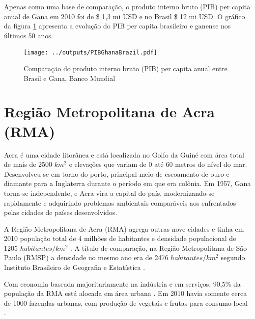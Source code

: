 Apenas como uma base de comparação, o produto interno bruto (PIB) per capita 
anual de Gana em 2010 foi de \$ 1,3 mi USD e no Brasil \$ 12 mi USD. 
O gráfico da figura \ref{fg:pib} apresenta a evolução do PIB per capita brasileiro e 
ganense nos últimos 50 anos.

\begin{figure}[H]
  \centering
  \texttt{[image: ../outputs/PIBGhanaBrazil.pdf]}
  \caption{Comparação do produto interno bruto (PIB) per capita anual entre 
           Brasil e Gana, Banco Mundial \citeyearpar{bancomundial} 
          \label{fg:pib}}
\end{figure}


\newpage
\section{Região Metropolitana de Acra (RMA)}

Acra é uma cidade litorânea e está localizada no Golfo da Guiné com área total
de mais de  2500 $km^2$ e elevações que variam de 0 até 60 metros do nível do 
mar. Desenvolveu-se em torno do porto, principal meio de escoamento de ouro e 
diamante para a Inglaterra durante o período em que era colônia. 
Em 1957, Gana torna-se independente, e Acra vira a capital do país, 
modernizando-se rapidamente e adquirindo problemas ambientais comparáveis aos enfrentados pelas cidades de países desenvolvidos.

A Região Metropolitana de Acra (RMA) agrega outras nove cidades e tinha em 2010
população total de 4 milhões de habitantes e densidade populacional de 
1205 $habitantes/km^2$ \citep{ghanacensus2013}. 
A título de comparação, na Região Metropolitana de São 
Paulo (RMSP) a densidade no mesmo ano era de 2476 $habitantes/km^2$ 
segundo Instituto Brasileiro de Geografia e Estatística \citep{ibge2011}. 

Com economia baseada majoritariamente na indústria e em serviços, 90,5\% da 
população da RMA está alocada em área urbana \citep{ghanacensus2013}.
Em 2010 havia somente cerca de 1000 fazendas urbanas, com produção de 
vegetais e frutas para consumo local \citep{lente2014}. 
 
